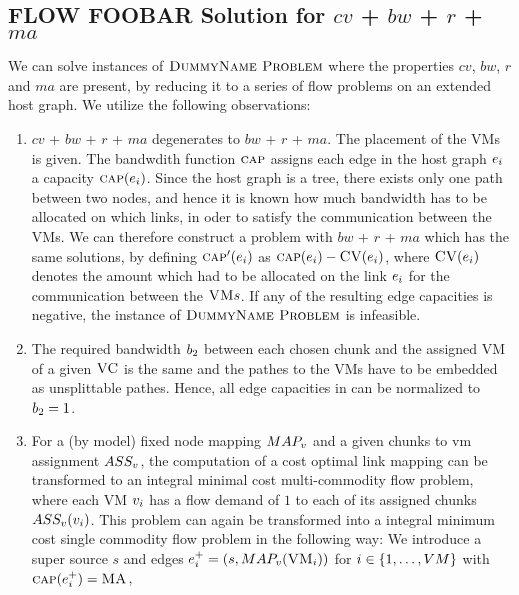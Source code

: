 \subsection{FLOW FOOBAR Solution for $cv$ + $bw$ + $r$ + $ma$}

We can solve instances of $\textsc{DummyName Problem}$ where the properties $cv$, $bw$, $r$ and 
$ma$
are present, by reducing it to a series of flow problems on an extended 
host graph. We utilize the following observations:

\newcommand{\Source}{\ensuremath{s}}
\newcommand{\Sink}{\ensuremath{t}}

\begin{enumerate}
\item $cv$ + $bw$ + $r$ + $ma$ degenerates to  $bw$ + $r$ + $ma$. 
The placement of the VMs is given. The bandwdith function $\textsc{cap}$ assigns 
each edge in the host graph $e_i$ a capacity 
$\textsc{cap}(e_i)$. Since the 
host graph is a tree, there exists only one path between two nodes, and hence 
it is known how much bandwidth has to be allocated on which links, in oder to 
satisfy the communication between the VMs. We can therefore construct a 
problem with $bw$ + $r$ + $ma$ which has the same solutions, by defining 
$\textsc{cap}'(e_i)$ as 
$\textsc{cap}(e_i) - \textsc{CV}(e_i)$, where 
$\textsc{CV}(e_i)$ denotes the amount which 
had to be allocated on the link $e_i$ for the communication 
between the $\textsc{VM} s$. If any of the resulting edge capacities is negative, the 
instance of $\textsc{DummyName Problem}$ is infeasible.
\item The required bandwidth $b_2$ between each chosen chunk and the 
assigned VM of a given $\textsc{VC}$ is 
the same and the pathes to the VMs have to be embedded as unsplittable 
pathes. Hence, all edge capacities in can be normalized to $b_2 = 1$.
\item For a (by model) fixed node mapping $MAP_v$ and a given chunks to 
vm assignment $ASS_v$, the computation of a cost 
optimal link mapping can be transformed to an integral minimal cost multi-commodity 
flow problem, where each VM $v_i$ has a flow demand of $1$ to each 
of its assigned chunks $ASS_v(v_i)$. This problem can 
again be transformed into a integral minimum cost single commodity flow problem 
in the following way: 
We introduce a 
super source $\Source$ and edges $\SubstrateEdge_i^+ = (\Source, 
\NodeMapping(\VM_i))$ for 
$i \in \{1,\dots,VM\}$ with $\textsc{cap}(e_i^+) = \textsc{MA}$, 

\end{enumerate}
